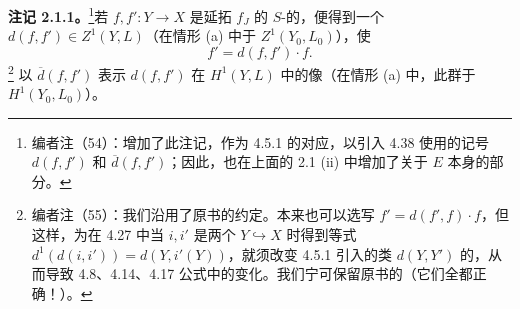 \textbf{注记 2.1.1。}\footnote{编者注（54）：增加了此注记，作为 4.5.1 的对应，以引入 4.38 使用的记号 $d(f,f')$ 和 $\overline d(f,f')$；因此，也在上面的 2.1 (ii) 中增加了关于 $E$ 本身的部分。}若 $f,f':Y\to X$ 是延拓 $f_J$ 的 $S$-的，便得到一个 $d(f,f')\in Z^1(Y,L)$（在情形 (a) 中于 $Z^1(Y_0,L_0)$），使
\[
 f'=d(f,f')\cdot f. \tag{*}
\]\footnote{编者注（55）：我们沿用了原书的约定。本来也可以选写 $f'=d(f',f)\cdot f$，但这样，为在 4.27 中当 $i,i'$ 是两个 $Y\hookrightarrow X$ 时得到等式 $d^1(d(i,i'))=d(Y,i'(Y))$，就须改变 4.5.1 引入的类 $d(Y,Y')$ 的，从而导致 4.8、4.14、4.17 公式中的变化。我们宁可保留原书的（它们全都正确！）。}
以 $\overline d(f,f')$ 表示 $d(f,f')$ 在 $H^1(Y,L)$ 中的像（在情形 (a) 中，此群于 $H^1(Y_0,L_0)$）。

